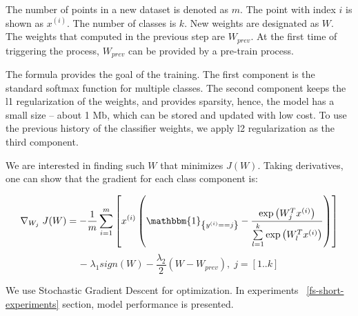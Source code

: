 The number of points in a new dataset is denoted as $m$. The point with index $i$ is shown as $x^{(i)}$. The number of classes is $k$. New weights are designated as $W$. The weights that computed in the previous step are $W_{prev}$. At the first time of triggering the process, $W_{prev}$ can be provided by a pre-train process.  

The formula provides the goal of the training. The first component is the standard softmax function for multiple classes. The second component keeps the l1 regularization of the weights, and provides sparsity, hence, the model has a small size -- about 1 Mb, which can be stored and updated with low cost. To use the previous history of the classifier weights, we apply l2 regularization as the third component. 

We are interested in finding such $W$ that minimizes $J(W)$. Taking derivatives, one can show that the gradient for each class component is:

\begin{center}

$$ \nabla_{W_j} \; J(W) = -\frac{1}{m} \sum \limits_{i = 1}^{m} \left[ x^{(i)} \left( \mathbbm{1}_{\left\{y^{(i)} == j\right\} } - \frac{\exp\left({W_{j}^Tx^{(i)}}\right)}{\sum \limits_{l = 1}^{k}  \exp\left({W_{l}^Tx^{(i)}}\right)} \right) \right] $$
$$ - \; \lambda_1 sign\left(W\right) - \frac{\lambda_2}{2} \left(W - W_{prev} \right), \; j = [1..k] $$

\end{center} 

We use Stochastic Gradient Descent for optimization. In experiments ~\ref{fs-short-experiments} section, model performance is presented.